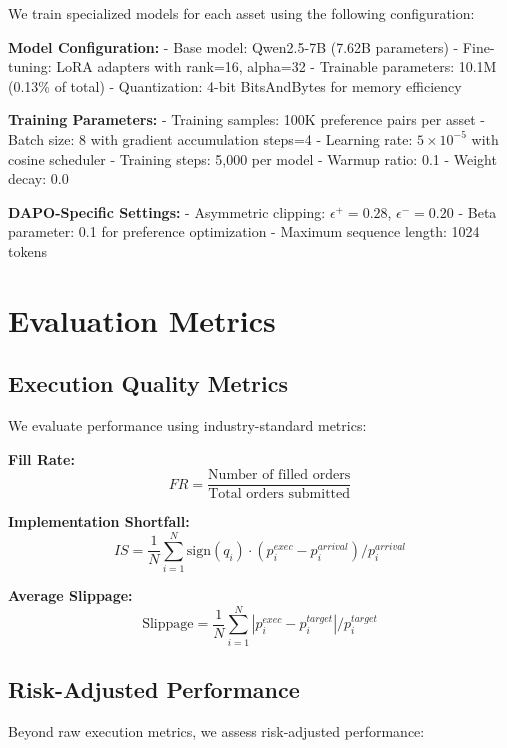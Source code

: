 \documentclass{report}
\begin{document}
We train specialized models for each asset using the following configuration:

\textbf{Model Configuration:}
- Base model: Qwen2.5-7B (7.62B parameters)
- Fine-tuning: LoRA adapters with rank=16, alpha=32
- Trainable parameters: 10.1M (0.13\% of total)
- Quantization: 4-bit BitsAndBytes for memory efficiency

\textbf{Training Parameters:}
- Training samples: 100K preference pairs per asset
- Batch size: 8 with gradient accumulation steps=4
- Learning rate: $5 \times 10^{-5}$ with cosine scheduler
- Training steps: 5,000 per model
- Warmup ratio: 0.1
- Weight decay: 0.0

\textbf{DAPO-Specific Settings:}
- Asymmetric clipping: $\epsilon^+ = 0.28$, $\epsilon^- = 0.20$
- Beta parameter: 0.1 for preference optimization
- Maximum sequence length: 1024 tokens

\section{Evaluation Metrics}

\subsection{Execution Quality Metrics}

We evaluate performance using industry-standard metrics:

\textbf{Fill Rate:}
\begin{equation}
FR = \frac{\text{Number of filled orders}}{\text{Total orders submitted}}
\end{equation}

\textbf{Implementation Shortfall:}
\begin{equation}
IS = \frac{1}{N} \sum_{i=1}^{N} \text{sign}(q_i) \cdot (p^{exec}_i - p^{arrival}_i) / p^{arrival}_i
\end{equation}

\textbf{Average Slippage:}
\begin{equation}
\text{Slippage} = \frac{1}{N} \sum_{i=1}^{N} |p^{exec}_i - p^{target}_i| / p^{target}_i
\end{equation}

\subsection{Risk-Adjusted Performance}

Beyond raw execution metrics, we assess risk-adjusted performance:
\end{document}
